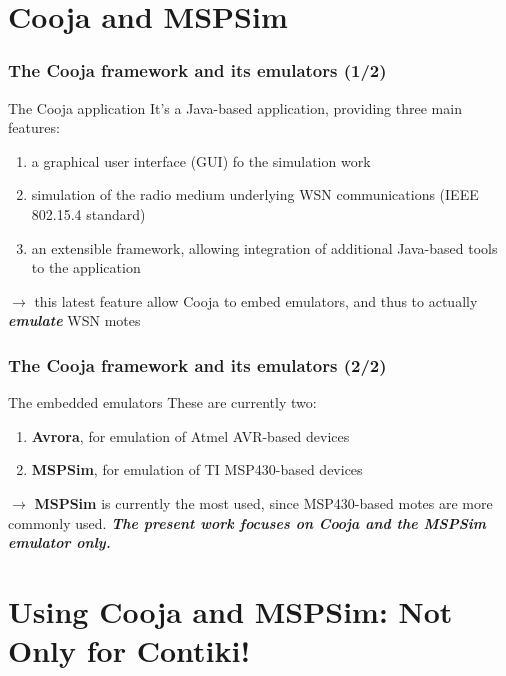\documentclass[10pt,c]{beamer}
\renewcommand{\emph}[1]{\textbf{\textit{#1}}}
\newcommand{\nom}[1]{\textbf{#1}}
\begin{document}

\section{Cooja and MSPSim}

\begin{frame}
\frametitle{The Cooja framework and its emulators (1/2)}
\begin{block}{The Cooja application}
It's a Java-based application, providing three main features:
\begin{enumerate}
\item a graphical user interface (GUI) fo the simulation work
\item simulation of the radio medium underlying WSN communications
(IEEE 802.15.4 standard)
\item an extensible framework, allowing integration of additional
Java-based tools to the application
\end{enumerate}
$\rightarrow$ this latest feature allow Cooja to embed emulators,
and thus to actually \emph{emulate} WSN motes
\end{block}
\end{frame}

\begin{frame}
\frametitle{The Cooja framework and its emulators (2/2)}
\begin{exampleblock}{The embedded emulators}
These are currently two:
\begin{enumerate}
\item \nom{Avrora}, for emulation of Atmel AVR-based devices
\item \nom{MSPSim}, for emulation of TI MSP430-based devices
\end{enumerate}
$\rightarrow$ \nom{MSPSim} is currently the most used, since
MSP430-based motes are more commonly used. \emph{The present work
focuses on Cooja and the MSPSim emulator only.}
\end{exampleblock}
\end{frame}


\section{Using Cooja and MSPSim: Not Only for Contiki!}
\end{document}
